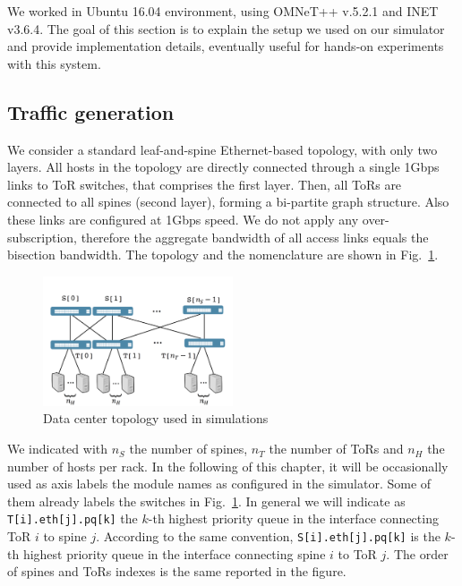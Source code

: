 We worked in Ubuntu 16.04 environment, using OMNeT++ v.5.2.1 and INET v3.6.4. 
The goal of this section is to explain the setup we used on our simulator and provide implementation details, eventually useful for hands-on experiments with this system. 
\subsection{Traffic generation}
We consider a standard leaf-and-spine Ethernet-based topology, with only two layers. All hosts in the topology are directly connected through a single 1Gbps links to ToR switches, that comprises the first layer. Then, all ToRs are connected to all spines (second layer), forming a bi-partite graph structure. Also these links are configured at 1Gbps speed. We do not apply any over-subscription, therefore the aggregate bandwidth of all access links equals the bisection bandwidth. The topology and the nomenclature are shown in Fig.~\ref{fig:simulation-topo}.
\begin{figure}
	\centering
	\includegraphics[width=0.5\textwidth]{Chapter4/Figures/topo-blue}
	\caption{Data center topology used in simulations}
	\label{fig:simulation-topo}
\end{figure}%
We indicated with $n_S$ the number of spines, $n_T$ the number of ToRs and $n_H$ the number of hosts per rack. In the following of this chapter, it will be occasionally used as axis labels the module names as configured in the simulator. Some of them already labels the switches in Fig.~\ref{fig:simulation-topo}. In general we will indicate as \texttt{T[i].eth[j].pq[k]} the $k$-th highest priority queue in the interface connecting ToR $i$ to spine $j$. According to the same convention, \texttt{S[i].eth[j].pq[k]} is the $k$-th highest priority queue in the interface connecting spine $i$ to ToR $j$. The order of spines and ToRs indexes is the same reported in the figure.

